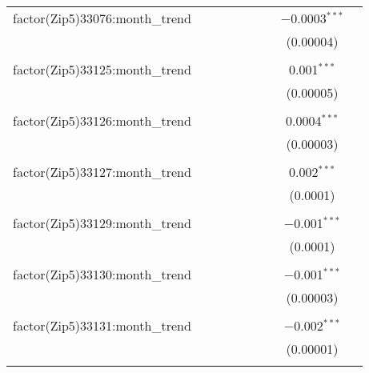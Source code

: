 \begin{table}[H]
{\begin{tabular}{@{\extracolsep{5pt}}lcccccccc}
  factor(Zip5)33076:month\_trend &  &  &  &  &  &  & $-$0.0003$^{***}$ &  \\  

   &  &  &  &  &  &  & (0.00004) &  \\  

   & & & & & & & & \\  

  factor(Zip5)33125:month\_trend &  &  &  &  &  &  & 0.001$^{***}$ &  \\  

   &  &  &  &  &  &  & (0.00005) &  \\  

   & & & & & & & & \\  

  factor(Zip5)33126:month\_trend &  &  &  &  &  &  & 0.0004$^{***}$ &  \\  

   &  &  &  &  &  &  & (0.00003) &  \\  

   & & & & & & & & \\  

  factor(Zip5)33127:month\_trend &  &  &  &  &  &  & 0.002$^{***}$ &  \\  

   &  &  &  &  &  &  & (0.0001) &  \\  

   & & & & & & & & \\  

  factor(Zip5)33129:month\_trend &  &  &  &  &  &  & $-$0.001$^{***}$ &  \\  

   &  &  &  &  &  &  & (0.0001) &  \\  

   & & & & & & & & \\  

  factor(Zip5)33130:month\_trend &  &  &  &  &  &  & $-$0.001$^{***}$ &  \\  

   &  &  &  &  &  &  & (0.00003) &  \\  

   & & & & & & & & \\  

  factor(Zip5)33131:month\_trend &  &  &  &  &  &  & $-$0.002$^{***}$ &  \\  

   &  &  &  &  &  &  & (0.00001) &  \\  

   & & & & & & & & \\  


\end{tabular}}
\end{table}
